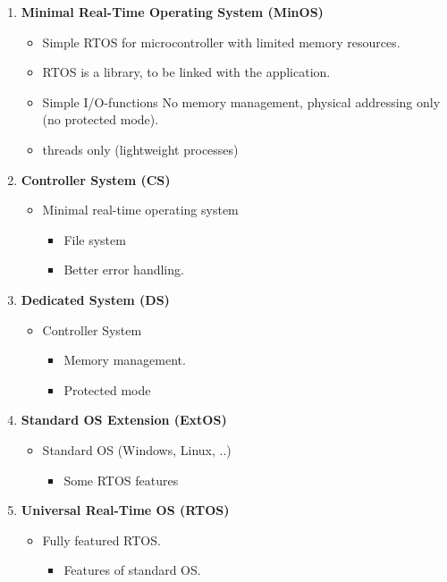 \begin{enumerate}
\item  \textbf{Minimal Real-Time Operating System (MinOS)} 

\begin{itemize}
	\item Simple RTOS for microcontroller with limited memory resources.
	\item RTOS is a library, to be linked with the application.
	\item Simple I/O-functions No memory management, physical addressing only (no protected mode).
	\item threads only (lightweight processes)
\end{itemize}

\item  \textbf{Controller System (CS)} 

\begin{itemize}
	\item Minimal real-time operating system 
	\begin{itemize}
	\item File system
	\item Better error handling.
	\end{itemize}
\end{itemize}
\os{\newpage}
\item  \textbf{Dedicated System (DS)}   
\begin{itemize}
	\item  Controller System
	\begin{itemize}
	\item Memory management.
	\item Protected mode
	\end{itemize}	     
\end{itemize}

\item  \textbf{Standard OS Extension (ExtOS)}
\begin{itemize}
	\item  Standard OS (Windows, Linux, ..)  
	\begin{itemize}
	\item Some RTOS features
	\end{itemize}
\end{itemize} 

\item  \textbf{Universal Real-Time OS (RTOS)} 
\begin{itemize}
\item  Fully featured RTOS.
	\begin{itemize}
	\item Features of standard OS.
	\end{itemize}
\end{itemize} 
\end{enumerate}

